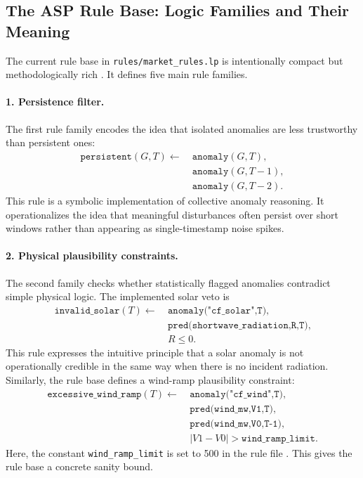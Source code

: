 \subsection{The ASP Rule Base: Logic Families and Their Meaning}

The current rule base in \texttt{rules/market\_rules.lp} is intentionally compact but methodologically rich \cite{repo_thesis_grid_anomaly}. It defines five main rule families.

\paragraph{1. Persistence filter.}
The first rule family encodes the idea that isolated anomalies are less trustworthy than persistent ones:
\begin{align}
	\texttt{persistent}(G, T) \leftarrow
	&\ \texttt{anomaly}(G, T), \nonumber\\
	&\ \texttt{anomaly}(G, T-1), \nonumber\\
	&\ \texttt{anomaly}(G, T-2).
	\label{eq:persistence_rule}
\end{align}
This rule is a symbolic implementation of collective anomaly reasoning. It operationalizes the idea that meaningful disturbances often persist over short windows rather than appearing as single-timestamp noise spikes.

\paragraph{2. Physical plausibility constraints.}
The second family checks whether statistically flagged anomalies contradict simple physical logic. The implemented solar veto is
\begin{equation}
	\begin{aligned}
		\texttt{invalid\_solar}(T) \leftarrow & \ \texttt{anomaly("cf\_solar",T)}, \\
		& \ \texttt{pred(shortwave\_radiation,R,T)}, \\
		& \ R \le 0.
	\end{aligned}
	\label{eq:invalid_solar_rule}
\end{equation}
This rule expresses the intuitive principle that a solar anomaly is not operationally credible in the same way when there is no incident radiation. Similarly, the rule base defines a wind-ramp plausibility constraint:
\begin{align}
	\texttt{excessive\_wind\_ramp}(T) \leftarrow
	&\ \texttt{anomaly("cf\_wind",T)}, \nonumber\\
	&\ \texttt{pred(wind\_mw,V1,T)}, \nonumber\\
	&\ \texttt{pred(wind\_mw,V0,T-1)}, \nonumber\\
	&\ |V1 - V0| > \texttt{wind\_ramp\_limit}.
	\label{eq:wind_ramp_rule}
\end{align}
Here, the constant \texttt{wind\_ramp\_limit} is set to 500 in the rule file \cite{repo_thesis_grid_anomaly}. This gives the rule base a concrete sanity bound.

